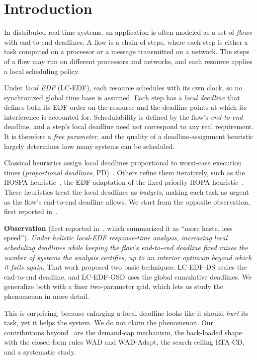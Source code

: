 \documentclass[conference]{IEEEtran}
\begin{document}
\section{Introduction}
\label{sec:intro}

In distributed real-time systems, an application is often modeled as a set of
\emph{flows} with end-to-end deadlines. A flow is a chain of steps, where each
step is either a task computed on a processor or a message transmitted on a
network. The steps of a flow may run on different processors and networks, and
each resource applies a local scheduling policy.

Under \emph{local EDF} (LC-EDF), each resource schedules with its own clock, so
no synchronized global time base is assumed. Each step has a \emph{local
deadline} that defines both its EDF order on the resource and the deadline points
at which its interference is accounted for. Schedulability is defined by the
flow's \emph{end-to-end} deadline, and a step's local deadline need not
correspond to any real requirement. It is therefore a \emph{free parameter}, and
the quality of a deadline-assignment heuristic largely determines how many
systems can be scheduled.

Classical heuristics assign local deadlines proportional to worst-case execution
times (\emph{proportional deadlines}, PD)~\cite{dinatale}. Others refine them
iteratively, such as the HOSPA heuristic~\cite{hospa}, the EDF adaptation of the
fixed-priority HOPA heuristic~\cite{hopa}. These heuristics treat the local
deadlines as \emph{budgets}, making each task as urgent as the flow's end-to-end
deadline allows. We start from the opposite observation, first reported
in~\cite{rivas15}.

\smallskip
\noindent\textbf{Observation} (first reported in~\cite{rivas15}, which
summarized it as ``more haste, less speed''). \emph{Under holistic local-EDF
response-time analysis, increasing local scheduling deadlines while keeping the
flow's end-to-end deadline fixed raises the number of systems the analysis
certifies, up to an interior optimum beyond which it falls again.}
That work proposed two basic techniques: LC-EDF-DS scales the end-to-end
deadline, and LC-EDF-GSD uses the global cumulative deadlines. We generalize
both with a finer two-parameter grid, which lets us study the phenomenon in more
detail.

This is surprising, because enlarging a local deadline looks like it should
\emph{hurt} its task, yet it helps the system. We do not claim the phenomenon.
Our contributions beyond~\cite{rivas15} are the demand-cap mechanism, the
back-loaded shape with the closed-form rules WAD and WAD-Adapt, the search
ceiling RTA-CD, and a systematic study.
\end{document}
